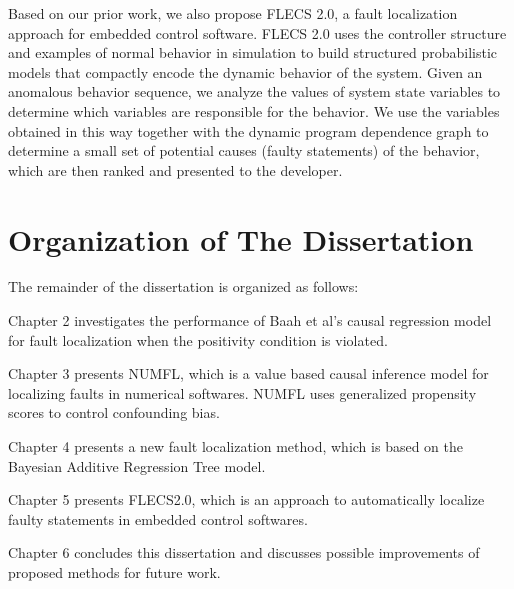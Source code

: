 Based on our prior work, we also propose FLECS 2.0, a fault localization approach for embedded control software. FLECS 2.0 uses the controller structure and examples of normal behavior in simulation to build structured probabilistic models that compactly encode the dynamic behavior of the system. Given an anomalous behavior sequence, we analyze the values of system state variables to determine which variables are responsible for the behavior. We use the variables obtained in this way together with the dynamic program dependence graph to determine a small set of potential causes (faulty statements) of the behavior, which are then ranked and presented to the developer.

\section{Organization of The Dissertation}

The remainder of the dissertation is organized as follows:

Chapter 2 investigates the performance of Baah et al’s causal regression model for fault localization when the positivity condition is violated.

Chapter 3 presents NUMFL, which is a value based causal inference model for localizing faults in numerical softwares. NUMFL uses generalized propensity scores to control confounding bias.

Chapter 4 presents a new fault localization method, which is based on  the Bayesian Additive Regression Tree model.

Chapter 5 presents FLECS2.0, which is an approach to automatically localize faulty statements in embedded control softwares.

Chapter 6 concludes this dissertation and discusses possible improvements of proposed methods for future work.



